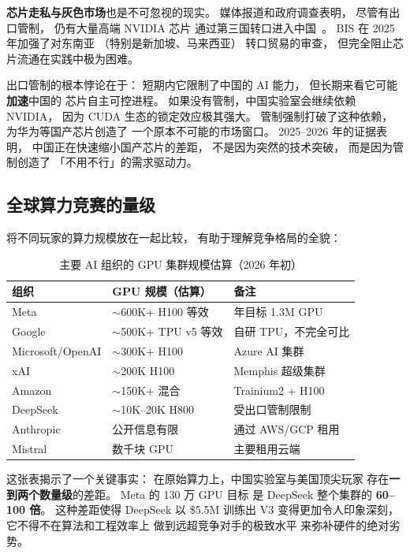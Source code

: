 \textbf{芯片走私与灰色市场}也是不可忽视的现实。
媒体报道和政府调查表明，
尽管有出口管制，
仍有大量高端 NVIDIA 芯片
通过第三国转口进入中国~\cite{harithas2024chipsmuggling}。
BIS 在 2025 年加强了对东南亚
（特别是新加坡、马来西亚）
转口贸易的审查，
但完全阻止芯片流通在实践中极为困难。

\begin{warnbox}[出口管制的长期博弈]
出口管制的根本悖论在于：
短期内它限制了中国的 AI 能力，
但长期来看它可能\textbf{加速}中国的
芯片自主可控进程。
如果没有管制，中国实验室会继续依赖 NVIDIA，
因为 CUDA 生态的锁定效应极其强大。
管制强制打破了这种依赖，
为华为等国产芯片创造了
一个原本不可能的市场窗口。
2025--2026 年的证据表明，
中国正在快速缩小国产芯片的差距，
不是因为突然的技术突破，
而是因为管制创造了
「不用不行」的需求驱动力。
\end{warnbox}

\subsection{全球算力竞赛的量级}

将不同玩家的算力规模放在一起比较，
有助于理解竞争格局的全貌：

\begin{table}[H]
\centering\small
\renewcommand{\arraystretch}{1.3}
\caption{主要 AI 组织的 GPU 集群规模估算（2026 年初）}\label{tab:gpu-clusters}
\begin{tabularx}{\linewidth}{l l >{\raggedright\arraybackslash}X}
\toprule
\rowcolor{figLightGray}
\textbf{组织} & \textbf{GPU 规模（估算）} & \textbf{备注} \\
\midrule
Meta & $\sim$600K+ H100 等效 & 2026 年目标 1.3M GPU \\
Google & $\sim$500K+ TPU v5 等效 & 自研 TPU，不完全可比 \\
Microsoft/OpenAI & $\sim$300K+ H100 & Azure AI 集群 \\
xAI & $\sim$200K H100 & Memphis 超级集群 \\
Amazon & $\sim$150K+ 混合 & Trainium2 + H100 \\
DeepSeek & $\sim$10K--20K H800 & 受出口管制限制 \\
Anthropic & 公开信息有限 & 通过 AWS/GCP 租用 \\
Mistral & 数千块 GPU & 主要租用云端 \\
\bottomrule
\end{tabularx}
\end{table}

这张表揭示了一个关键事实：
在原始算力上，中国实验室与美国顶尖玩家
存在\textbf{一到两个数量级}的差距。
Meta 的 130 万 GPU 目标
是 DeepSeek 整个集群的 \textbf{60--100 倍}。
这种差距使得 DeepSeek 以 \$5.5M 训练出 V3
变得更加令人印象深刻，
它不得不在算法和工程效率上
做到远超竞争对手的极致水平
来弥补硬件的绝对劣势。

